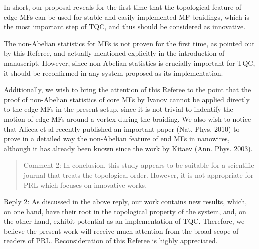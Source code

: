 \documentclass[11pt]{article}
\begin{document}
In short, our proposal reveals for the first time that the topological
feature of edge MFs can be used for stable and easily-implemented MF
braidings, which is the most important step of TQC, and thus should be
considered as innovative.

The non-Abelian statistics for MFs is not proven for the first time, as
pointed out by this Referee, and actually mentioned explicitly in the
introduction of manuscript. However, since non-Abelian statistics is
crucially important for TQC, it should be reconfirmed in any system
proposed as its implementation.

Additionally, we wish to bring the attention of this Referee to the
point that the proof of non-Abelian statistics of core MFs by Ivanov
cannot be applied directly to the edge MFs in the present setup, since
it is not trivial to indentify the motion of edge MFs around a vortex
during the braiding. We also wish to notice that Alicea et al recently
published an important paper (Nat. Phys. 2010) to prove in a detailed
way the non-Abelian feature of end MFs in nanowires, although it has
already been known since the work by Kitaev (Ann. Phys. 2003).

\begin{quote}
Comment 2: In conclusion, this study appears to be suitable for a
scientific journal that treats the topological order. However, it is not
appropriate for PRL which focuses on innovative works.
\end{quote}

Reply 2: As discussed in the above reply, our work contains new results,
which, on one hand, have their root in the topological property of the
system, and, on the other hand, exhibit potential as an implementation
of TQC. Therefore, we believe the present work will receive much
attention from the broad scope of readers of PRL. Reconsideration of
this Referee is highly appreciated.


    
    
    
    
\end{document}
